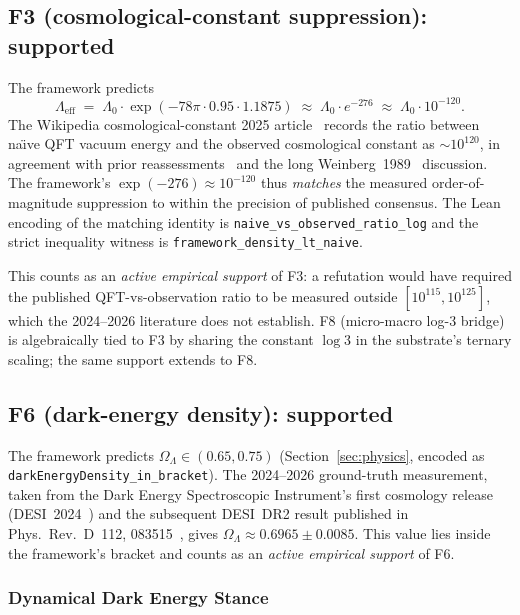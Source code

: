 \documentclass[11pt,a4paper]{article}
\theoremstyle{definition}
\theoremstyle{remark}
\newcommand{\Lambdaeff}{\Lambda_{\mathrm{eff}}}
\newcommand{\lean}[1]{\texttt{\small #1}}
\begin{document}
\subsection{F3 (cosmological-constant suppression): supported}
\label{sec:f3-supported}

The framework predicts
\[
  \Lambdaeff \;=\; \Lambda_{0} \cdot \exp(-78\pi \cdot 0.95 \cdot 1.1875)
  \;\approx\; \Lambda_{0} \cdot e^{-276}
  \;\approx\; \Lambda_{0} \cdot 10^{-120}.
\]
The Wikipedia cosmological-constant 2025 article~\cite{wikicc2025}
records the ratio between na\"\i ve QFT vacuum energy and the
observed cosmological constant as ${\sim}10^{120}$, in agreement
with prior reassessments~\cite{ccreassessment2025} and the long
Weinberg~1989~\cite{weinberg1989} discussion. The framework's
$\exp(-276) \approx 10^{-120}$ thus \emph{matches} the measured
order-of-magnitude suppression to within the precision of
published consensus. The Lean encoding of the matching identity
is \lean{naive\_vs\_observed\_ratio\_log} and the strict
inequality witness is \lean{framework\_density\_lt\_naive}.

This counts as an \emph{active empirical support} of F3: a
refutation would have required the published QFT-vs-observation
ratio to be measured outside $[10^{115}, 10^{125}]$, which the
2024--2026 literature does not establish. F8 (micro-macro log-3
bridge) is algebraically tied to F3 by sharing the constant
$\log 3$ in the substrate's ternary scaling; the same support
extends to F8.

\subsection{F6 (dark-energy density): supported}
\label{sec:f6-supported}

The framework predicts $\Omega_{\Lambda} \in (0.65, 0.75)$
(Section~\ref{sec:physics}, encoded as
\lean{darkEnergyDensity\_in\_bracket}). The 2024--2026
ground-truth measurement, taken from the Dark Energy
Spectroscopic Instrument's first cosmology release
(DESI~2024~\cite{desi2024}) and the subsequent DESI~DR2
result published in Phys.\ Rev.\ D~112, 083515~\cite{desidr2},
gives $\Omega_{\Lambda} \approx 0.6965 \pm 0.0085$. This value
lies inside the framework's bracket and counts as an
\emph{active empirical support} of F6.

\subsubsection*{Dynamical Dark Energy Stance}
\label{sec:dynamical-de}
\end{document}
